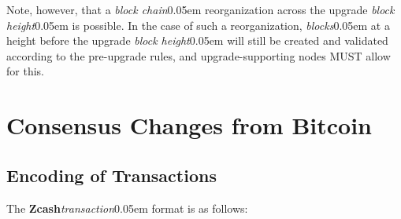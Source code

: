 \documentclass{article}
\newcommand{\textbnx}[1]{{\fontseries{b}\selectfont #1}}
\newcommand{\intropart}{\needspace{55ex}}
\numberwithin{theorem}{subsection}
\newcommand{\todo}[1]{{\color{Sepia}\sf{TODO: #1}}}
\newcommand{\term}[1]{\textsl{#1}\kern 0.05em\xspace}
\newcommand{\titleterm}[1]{#1}
\newcommand{\termbf}[1]{\textbf{#1}\xspace}
\newcommand{\conformance}[1]{\textbnx{#1}\xspace}
\newcommand{\Zcash}{\termbf{Zcash}}
\newcommand{\Sapling}{\termbf{Sapling}}
\newcommand{\Bitcoin}{\termbf{Bitcoin}}
\newcommand{\MUST}{\conformance{MUST}}
\newcommand{\noteCommitmentTree}{\term{note commitment tree}}
\newcommand{\blocks}{\term{blocks}}
\newcommand{\blockHeight}{\term{block height}}
\newcommand{\transaction}{\term{transaction}}
\newcommand{\transactions}{\term{transactions}}
\newcommand{\Transactions}{\titleterm{Transactions}}
\newcommand{\blockchain}{\term{block chain}}
\newcommand{\nullifierSet}{\term{nullifier set}}
\begin{document}
{Note, however, that a
\blockchain reorganization across the upgrade \blockHeight is possible.
In the case of such a reorganization, \blocks at a height
before the upgrade \blockHeight will still be created and
validated according to the pre-upgrade rules, and
upgrade-supporting nodes \MUST allow for this.


} %


\intropart
\section{Consensus Changes from \Bitcoin}

\subsection{Encoding of \Transactions} \label{txnencoding}

The \Zcash \transaction format is as follows:
\end{document}
